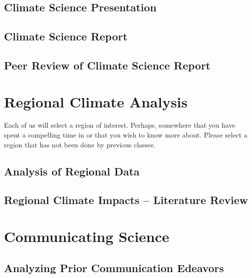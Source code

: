 \documentclass{article}\usepackage[]{graphicx}\usepackage[]{color}
\begin{document}
\subsection{Climate Science Presentation}





\subsection{Climate Science Report}



\subsection{Peer Review of Climate Science Report}



\section{Regional Climate Analysis}

Each of us will select a region of interest. Perhaps, somewhere that you have spent a compelling time in or that you wish to know more about. Please select a region that has not been done by previous classes. 

\subsection{Analysis of Regional Data}



\subsection{Regional Climate Impacts -- Literature Review}



\section{Communicating Science}

\subsection{Analyzing Prior Communication Edeavors}
\end{document}
